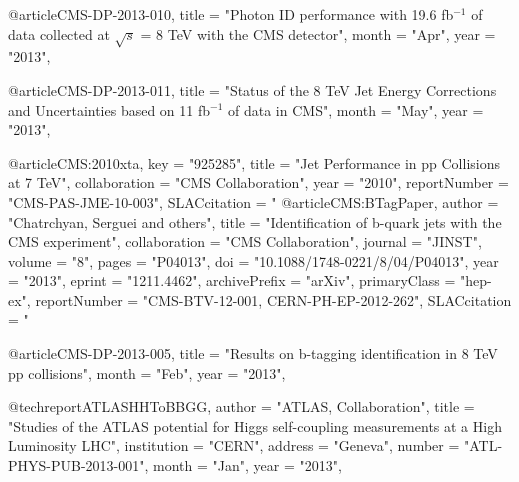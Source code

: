 \clearpage

\vspace*{-0.2cm}

 

@article{CMS-DP-2013-010,
      title        = "Photon ID performance with 19.6 fb$^{-1}$ of data collected
                      at $\sqrt{s}$ = 8 TeV with the CMS detector",
      month        = "Apr",
      year         = "2013",
}

@article{CMS-DP-2013-011,
      title        = "Status of the 8 TeV Jet Energy Corrections and
                      Uncertainties based on 11 fb$^{-1}$ of data in CMS",
      month        = "May",
      year         = "2013",
}

@article{CMS:2010xta,
      key            = "925285",
      title          = "{Jet Performance in pp Collisions at 7 TeV}",
      collaboration  = "CMS Collaboration",
      year           = "2010",
      reportNumber   = "CMS-PAS-JME-10-003",
      SLACcitation   = "%
}
@article{CMS:BTagPaper,
      author         = "Chatrchyan, Serguei and others",
      title          = "{Identification of b-quark jets with the CMS experiment}",
      collaboration  = "CMS Collaboration",
      journal        = "JINST",
      volume         = "8",
      pages          = "P04013",
      doi            = "10.1088/1748-0221/8/04/P04013",
      year           = "2013",
      eprint         = "1211.4462",
      archivePrefix  = "arXiv",
      primaryClass   = "hep-ex",
      reportNumber   = "CMS-BTV-12-001, CERN-PH-EP-2012-262",
      SLACcitation   = "%
}

@article{CMS-DP-2013-005,
      title        = "Results on b-tagging identification in 8 TeV pp collisions",
      month        = "Feb",
      year         = "2013",
}

@techreport{ATLASHHToBBGG,
      author       = "ATLAS, Collaboration",
      title        = "Studies of the ATLAS potential for Higgs self-coupling
                      measurements at a High Luminosity LHC",
      institution  = "CERN",
      address      = "Geneva",
      number       = "ATL-PHYS-PUB-2013-001",
      month        = "Jan",
      year         = "2013",
}